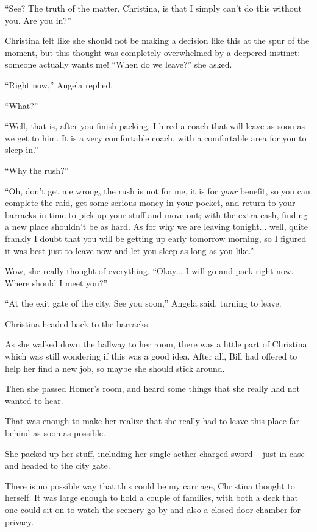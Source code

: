 \documentclass[showtrims,b6paper,draft,10pt]{memoir}
\begin{document}
``See?  The truth of the matter, Christina, is that I simply can't do this without you.  Are you in?''

Christina felt like she should not be making a decision like this at the spur of the moment, but this thought was completely overwhelmed by a deepered instinct:  someone actually wants me!  ``When do we leave?''  she asked.

``Right now,'' Angela replied.

``What?''

``Well, that is, after you finish packing.  I hired a coach that will leave as soon as we get to him.  It is a very comfortable coach, with a comfortable area for you to sleep in.''

``Why the rush?''

``Oh, don't get me wrong, the rush is not for me, it is for \emph{your} benefit, so you can complete the raid, get some serious money in your pocket, and return to your barracks in time to pick up your stuff and move out;  with the extra cash, finding a new place shouldn't be as hard.  As for why we are leaving tonight... well, quite frankly I doubt that you will be getting up early tomorrow morning, so I figured it was best just to leave now and let you sleep as long as you like.''

Wow, she really thought of everything.  ``Okay... I will go and pack right now.  Where should I meet you?''

``At the exit gate of the city.  See you soon,'' Angela said, turning to leave.

Christina headed back to the barracks.

\timeskip
As she walked down the hallway to her room, there was a little part of Christina which was still wondering if this was a good idea.  After all, Bill had offered to help her find a new job, so maybe she should stick around.

Then she passed Homer's room, and heard some things that she really had not wanted to hear.

That was enough to make her realize that she really had to leave this place far behind as soon as possible.

She packed up her stuff, including her single aether-charged sword -- just in case -- and headed to the city gate.

\timeskip
There is no possible way that this could be my carriage, Christina thought to herself.  It was large enough to hold a couple of families, with both a deck that one could sit on to watch the scenery go by and also a closed-door chamber for privacy.
\end{document}
